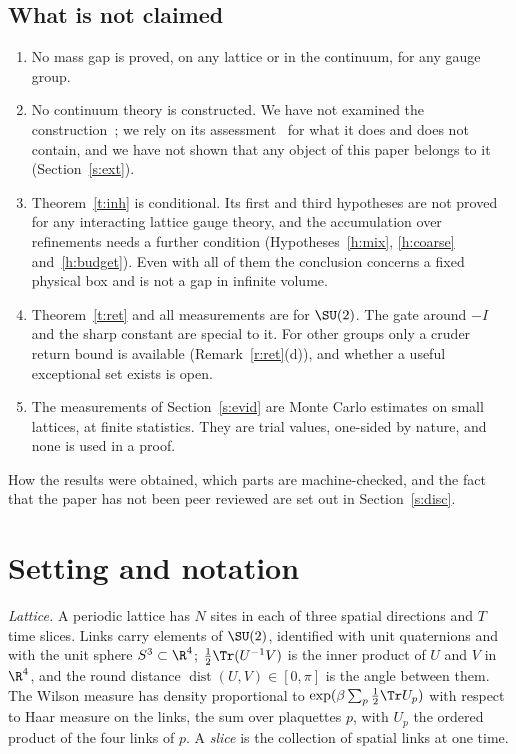 \subsection{What is not claimed}\label{s:not}
\begin{enumerate}
\item No mass gap is proved, on any lattice or in the continuum, for any gauge group.
\item No continuum theory is constructed. We have not examined the construction~\cite{OAI}; we rely on its
assessment~\cite{YMG} for what it does and does not contain, and we have not shown that any object of this
paper belongs to it (Section~\ref{s:ext}).
\item Theorem~\ref{t:inh} is conditional. Its first and third hypotheses are not proved for any interacting
lattice gauge theory, and the accumulation over refinements needs a further condition
(Hypotheses~\ref{h:mix}, \ref{h:coarse} and~\ref{h:budget}). Even with all of them the conclusion concerns a
fixed physical box and is not a gap in infinite volume.
\item Theorem~\ref{t:ret} and all measurements are for $\SU(2)$. The gate around $-I$ and the sharp constant
are special to it. For other groups only a cruder return bound is available (Remark~\ref{r:ret}(d)), and
whether a useful exceptional set exists is open.
\item The measurements of Section~\ref{s:evid} are Monte Carlo estimates on small lattices, at finite
statistics. They are trial values, one-sided by nature, and none is used in a proof.
\end{enumerate}

How the results were obtained, which parts are machine-checked, and the fact that the paper has not been
peer reviewed are set out in Section~\ref{s:disc}.

\section{Setting and notation}\label{s:set}
\emph{Lattice.} A periodic lattice has $N$ sites in each of three spatial directions and $T$ time slices.
Links carry elements of $\SU(2)$, identified with unit quaternions and with the unit sphere $S^3\subset\R^4$;
$\tfrac12\Tr(U^{-1}V)$ is the inner product of $U$ and $V$ in $\R^4$, and the round distance
$\operatorname{dist}(U,V)\in[0,\pi]$ is the angle between them. The Wilson measure has density proportional
to $\exp(\beta\sum_p\tfrac12\Tr U_p)$ with respect to Haar measure on the links, the sum over plaquettes $p$,
with $U_p$ the ordered product of the four links of $p$. A \emph{slice} is the collection of spatial links at
one time.

